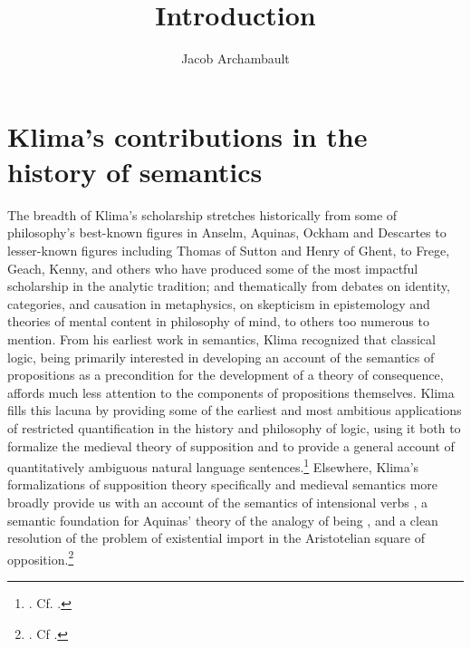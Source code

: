 \documentclass[]{article}
\title{Introduction}
\author{Jacob Archambault}
\begin{document}
\maketitle

\section{Klima's contributions in the history of semantics}
The breadth of Klima's scholarship stretches 
historically from some of philosophy's best-known figures in Anselm, Aquinas, Ockham and Descartes 
to lesser-known figures including Thomas of Sutton and Henry of Ghent, 
to Frege, Geach, Kenny, and others who have produced some of the most impactful scholarship in the analytic tradition; 
and 
thematically from debates 
on identity, categories, and causation in metaphysics, 
on skepticism in epistemology and theories of mental content in philosophy of mind, 
to others too numerous to mention. 
From his earliest work in semantics, 
Klima recognized that classical logic, 
being primarily interested in developing an account of the semantics of propositions as a precondition for the development of a theory of consequence, 
affords much less attention to the components of propositions themselves. 
Klima fills this lacuna by providing some of the earliest and most ambitious applications of restricted quantification in the history and philosophy of logic, 
using it both to formalize the medieval theory of supposition 
and to provide a general account of quantitatively ambiguous natural language sentences.\footnote{\autocite{Klima1988,Klima1990,KlimaSandu1990,Klima1991b}. Cf. \autocite{Parsons2014}.} 
Elsewhere, 
Klima's formalizations of supposition theory specifically 
and medieval semantics more broadly 
provide us with an account of the semantics of intensional verbs \autocite{Klima1991}, 
a semantic foundation for Aquinas' theory of the analogy of being \autocite{Klima1996,Klima2002}, 
and a clean resolution of the problem of existential import in the Aristotelian square of opposition.\footnote{\autocite{Klima2001}. Cf \autocite{Read2015b}.} 
\end{document}
